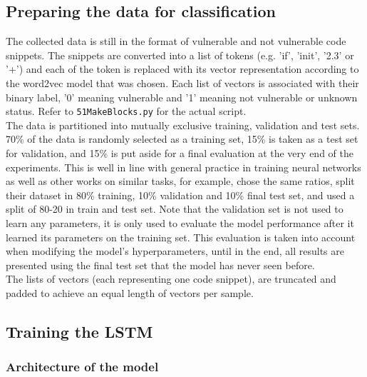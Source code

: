 \documentclass[
a4paper,
pagesize,
pdftex,
12pt,
twoside, %
BCOR=5mm, %
ngerman,
fleqn,
final,
]{scrartcl}
\begin{document}
	\subsection{Preparing the data for classification}
	The collected data is still in the format of vulnerable and not vulnerable code snippets. The snippets are converted into a list of tokens (e.g. 'if', 'init', '2.3' or '+') and each of the token is replaced with its vector representation according to the word2vec model that was chosen. Each list of vectors is associated with their binary label, '0' meaning vulnerable and '1' meaning not vulnerable or unknown status. Refer to \texttt{51MakeBlocks.py} for the actual script.\\
	The data is partitioned into mutually exclusive training, validation and test sets. 70\% of the data is randomly selected as a training set, 15\% is taken as a test set for validation, and 15\% is put aside for a final evaluation at the very end of the experiments. This is well in line with general practice in training neural networks as well as other works on similar tasks, for example, \cite{Dam.2016} chose the same ratios, \cite{Russell.2018} split their dataset in 80\% training, 10\% validation and 10\% final test set, and \cite{Li.2018} used a split of 80-20 in train and test set. Note that the validation set is not used to learn any parameters, it is only used to evaluate the model performance after it learned its parameters on the training set. This evaluation is taken into account when modifying the model's hyperparameters, until in the end, all results are presented using the final test set that the model has never seen before.\\
	The lists of vectors (each representing one code snippet), are truncated and padded to achieve an equal length of vectors per sample.
	
	\subsection{Training the LSTM}
	
	\subsubsection{Architecture of the model}
	
\end{document}
